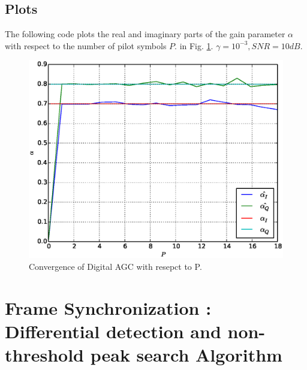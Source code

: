 \documentclass[journal,12pt,twocolumn]{IEEEtran}
\begin{document}
\subsection{Plots}
%

%
The following code plots the real and imaginary parts of the gain parameter $\alpha$ with respect to the number of pilot symbols $P$.
in Fig. \ref{fig:diffaoff}.  $\gamma = 10^{-3}, SNR=10 dB$.

%
\begin{figure}[!ht]
\begin{center}
\includegraphics[width=\columnwidth]{./figs/Convergence_of_Digital_AGC.eps}
\end{center}
\caption{Convergence of Digital AGC with resepct to P.}
\label{fig:diffaoff}
\end{figure}

\section{Frame Synchronization : Differential detection and non-threshold peak search Algorithm} 
%
\cite{frame_offset}
%
\end{document}

